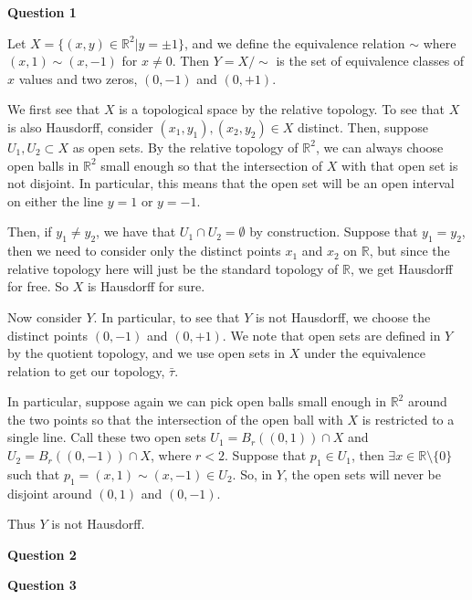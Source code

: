 \documentclass[10pt]{article}
\newcommand{\R}{\mathbb{R}}
\begin{document}
\textbf{Question 1}

Let $X = \{(x,y)\in\R^{2} | y=\pm 1\}$, and we define the equivalence relation $\sim$ where $(x,1) \sim (x,-1)$ for $x \neq 0$. Then $Y = X/\sim$ is the set of equivalence classes of $x$ values and two zeros, $(0,-1)$ and $(0,+1)$. 

We first see that $X$ is a topological space by the relative topology. To see that $X$ is also Hausdorff, consider $(x_{1},y_{1}), (x_{2},y_{2}) \in X$ distinct. Then, suppose $U_{1}, U_{2} \subset X$ as open sets. By the relative topology of $\R^{2}$, we can always choose open balls in $\R^{2}$ small enough so that the intersection of $X$ with that open set is not disjoint. In particular, this means that the open set will be an open interval on either the line $y=1$ or $y=-1$.

Then, if $y_{1} \neq y_{2}$, we have that $U_{1}\cap U_{2} = \emptyset$ by construction. Suppose that $y_{1} = y_{2}$, then we need to consider only the distinct points $x_{1}$ and $x_{2}$ on $\R$, but since the relative topology here will just be the standard topology of $\R$, we get Hausdorff for free. So $X$ is Hausdorff for sure.

Now consider $Y$. In particular, to see that $Y$ is not Hausdorff, we choose the distinct points $(0,-1)$ and $(0,+1)$. We note that open sets are defined in $Y$ by the quotient topology, and we use open sets in $X$ under the equivalence relation to get our topology, $\bar{\tau}$.

In particular, suppose again we can pick open balls small enough in $\R^{2}$ around the two points so that the intersection of the open ball with $X$ is restricted to a single line. Call these two open sets $U_{1} = B_{r}((0,1))\cap X$ and $U_{2} = B_{r}((0,-1))\cap X$, where $r < 2$. Suppose that $p_{1} \in U_{1}$, then $\exists x \in \R\setminus \{0\}$ such that $p_{1} = (x,1) \sim (x,-1) \in U_{2}$. So, in $Y$, the open sets will never be disjoint around $(0,1)$ and $(0,-1)$.

Thus $Y$ is not Hausdorff.

\newpage

\textbf{Question 2}

\newpage

\textbf{Question 3}
\end{document}
